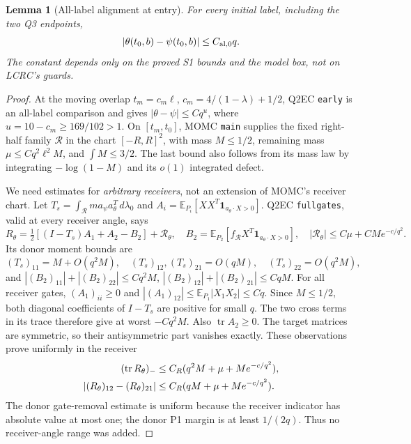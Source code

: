 \documentclass[11pt]{article}
\numberwithin{equation}{section}
\newtheorem{lemma}[theorem]{Lemma}
\theoremstyle{remark}\newtheorem{remark}[theorem]{Remark}
\newcommand{\E}{\mathbb E}
\newcommand{\dd}{\,d}
\newcommand{\one}{\mathbf1}
\begin{document}
\begin{lemma}[All-label alignment at entry]
\label{an03rbv1:entryalignment}
For every initial label, including the two Q3 endpoints,
\begin{equation}
 |\theta(t_0,b)-\psi(t_0,b)|\le C_{\rm al,0}q.
 \label{an03rbv1:deltaentry}
\end{equation}
The constant depends only on the proved S1 bounds and the model
box, not on LCRC's guards.
\end{lemma}
\begin{proof}
At the moving overlap $t_m=c_m\ell$,
$c_m=4/(1-\lambda)+1/2$, Q2EC \texttt{early} is an all-label
comparison and gives $|\theta-\psi|\le Cq^u$, where
$u=10-c_m\ge169/102>1$.
On $[t_m,t_0]$, MOMC \texttt{main} supplies the fixed right-half
family $\mathcal R$ in the chart $[-R,R]^2$, with mass
$M\le1/2$, remaining mass $\mu\le Cq^2\ell^2M$, and
$\int M\le3/2$. The last bound also follows from its mass law
by integrating $-\log(1-M)$ and its $o(1)$ integrated defect.

We need estimates for \emph{arbitrary receivers}, not an extension
of MOMC's receiver chart. Let
$T_s=\int_{\mathcal R}m a_\psi a_\theta^T\dd\lambda_0$ and
$A_i=\E_{P_i}[XX^T\one_{a_\theta\cdot X>0}]$.
Q2EC \texttt{fullgates}, valid at every receiver angle, says
\[
 R_\theta=\tfrac12[(I-T_s)A_1+A_2-B_2]+\mathcal R_\theta,
 \quad B_2=\E_{P_2}[f_{\mathcal R}X^T\one_{a_\theta\cdot X>0}],
 \quad |\mathcal R_\theta|\le C\mu+CM e^{-c/q^2}.
\]
Its donor moment bounds are
\[
 (T_s)_{11}=M+O(q^2M),\quad
 (T_s)_{12},(T_s)_{21}=O(qM),\quad (T_s)_{22}=O(q^2M),
\]
and $|(B_2)_{11}|+|(B_2)_{22}|\le Cq^2M$,
$|(B_2)_{12}|+|(B_2)_{21}|\le CqM$.
For all receiver gates, $(A_1)_{ii}\ge0$ and
$|(A_1)_{12}|\le\E_{P_1}|X_1X_2|\le Cq$.
Since $M\le1/2$, both diagonal coefficients of $I-T_s$ are
positive for small $q$. The two cross terms in its trace therefore
give at worst $-Cq^2M$. Also $\operatorname{tr}A_2\ge0$.
The target matrices are symmetric, so their antisymmetric part
vanishes exactly. These observations prove uniformly in the receiver
\begin{align}
 (\operatorname{tr}R_\theta)_-&\le
       C_R(q^2M+\mu+M e^{-c/q^2}),\notag\\
 |(R_\theta)_{12}-(R_\theta)_{21}|&\le
       C_R(qM+\mu+M e^{-c/q^2}).
 \label{an03rbv1:pretrace}
\end{align}
The donor gate-removal estimate is uniform because the receiver
indicator has absolute value at most one; the donor P1 margin
is at least $1/(2q)$. Thus no receiver-angle range was added.


\end{proof}
\end{document}
